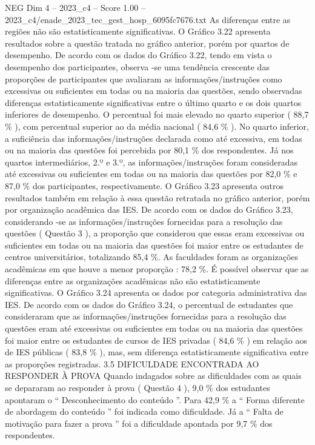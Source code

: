 \begin{textsample}{NEG Dim 4 – 2023\_c4 – Score 1.00 – 2023\_c4/enade\_2023\_tec\_gest\_hosp\_6095fc7676.txt}
As diferenças entre as regiões não são estatisticamente significativas.
O Gráfico 3.22 apresenta resultados sobre a questão tratada no gráfico anterior, porém por quartos de desempenho.
De acordo com os dados do Gráfico 3.22, tendo em vista o desempenho dos participantes, observa -se uma tendência crescente das proporções de participantes que avaliaram as informações/instruções como excessivas ou suficientes em todas ou na maioria das questões, sendo observadas diferenças estatisticamente significativas entre o último quarto e os dois quartos inferiores de desempenho.
O percentual foi mais elevado no quarto superior ( 88,7 \% ), com percentual superior ao da média nacional ( 84,6 \% ).
No quarto inferior, a suficiência das informações/instruções declarada como até excessiva, em todas ou na maioria das questões foi percebida por 80,1 \% dos respondentes.
Já nos quartos intermediários, 2.º e 3.º, as informações/instruções foram consideradas até excessivas ou suficientes em todas ou na maioria das questões por 82,0 \% e 87,0 \% dos participantes, respectivamente.
O Gráfico 3.23 apresenta outros resultados também em relação à essa questão retratada no gráfico anterior, porém por organização acadêmica das IES.
De acordo com os dados do Gráfico 3.23, considerando -se as informações/instruções fornecidas para a resolução das questões ( Questão 3 ), a proporção que considerou que essas eram excessivas ou suficientes em todas ou na maioria das questões foi maior entre os estudantes de centros universitários, totalizando 85,4 \%.
As faculdades foram as organizações acadêmicas em que houve a menor proporção : 78,2 \%.
É possível observar que as diferenças entre as organizações acadêmicas não são estatisticamente significativas.
O Gráfico 3.24 apresenta os dados por categoria administrativa das IES.
De acordo com os dados do Gráfico 3.24, o percentual de estudantes que consideraram que as informações/instruções fornecidas para a resolução das questões eram até excessivas ou suficientes em todas ou na maioria das questões foi maior entre os estudantes de cursos de IES privadas ( 84,6 \% ) em relação aos de IES públicas ( 83,8 \% ), mas, sem diferença estatisticamente significativa entre as proporções registradas. 3.5 DIFICULDADE ENCONTRADA AO RESPONDER À PROVA Quando indagados sobre as dificuldades com as quais se depararam ao responder à prova ( Questão 4 ), 9,0 \% dos estudantes apontaram o “ Desconhecimento do conteúdo ”.
Para 42,9 \% a “ Forma diferente de abordagem do conteúdo ” foi indicada como dificuldade.
Já a “ Falta de motivação para fazer a prova ” foi a dificuldade apontada por 9,7 \% dos respondentes.

\end{textsample}
